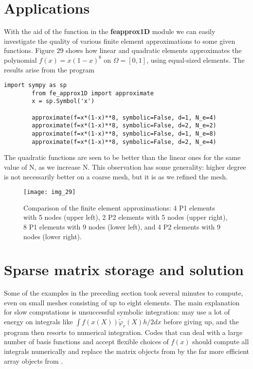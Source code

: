 \documentclass[../main.tex]{subfiles}
\begin{document}
	\section[Applications]{Applications}
	\label{sec:sec_4_7}
	\noindent With the aid of the  function in the  \textbf{fe\textunderscore approx1D}  module we can easily investigate the quality of various finite element approximations to some given functions. Figure 29 shows how linear and quadratic elements approximates the polynomial $f(x)=x(1-x)^{8}$ on $\Omega=[0,1]$, using equal-sized elements. The results arise from the program
	\begin{lstlisting}[numbers=none]
		import sympy as sp
		from fe_approx1D import approximate
		x = sp.Symbol('x')
		
		approximate(f=x*(1-x)**8, symbolic=False, d=1, N_e=4)
		approximate(f=x*(1-x)**8, symbolic=False, d=2, N_e=2)
		approximate(f=x*(1-x)**8, symbolic=False, d=1, N_e=8)
		approximate(f=x*(1-x)**8, symbolic=False, d=2, N_e=4)	
	\end{lstlisting}
	The quadratic functions are seen to be better than the linear ones for the same
	value of N, as we increase N. This observation has some generality: higher
	degree is not necessarily better on a coarse mesh, but it is as we refined the
	mesh.
	\begin{figure}[H]
		\centering
		\texttt{[image: img\_29]}
		\caption{Comparison of the finite element approximations: 4 P1 elements with
			5 nodes (upper left), 2 P2 elements with 5 nodes (upper right), 8 P1 elements
			with 9 nodes (lower left), and 4 P2 elements with 9 nodes (lower right).}
		\label{fig:img_29}
	\end{figure}
	\section[Sparse matrix storage and solution]{Sparse matrix storage and solution}
	\label{sec:sec_4_8}
	\noindent Some of the examples in the preceding section took several minutes to compute, even on small meshes consisting of up to eight elements. The main explanation for slow computations is unsuccessful symbolic integration:  may use a lot of energy on integrals like $\int f(x(X)) \tilde{\varphi}_{r}(X) h / 2 d x$ before giving up, and the program then resorts to numerical integration. Codes that can deal with a large number of basis functions and accept flexible choices of $f(x)$ should compute all integrals numerically and replace the matrix objects from  by the far more efficient array objects from .
	
\end{document}
